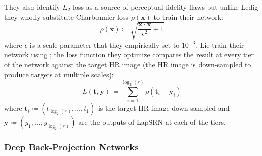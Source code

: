 They also identify \(L_2\) loss as a source of perceptual fidelity flaws but unlike Ledig \etal they wholly substitute Charbonnier loss \cite{charbonnier1994two} \(\rho(\bm{x})\) to train their network:
\begin{equation}
    \rho(\bm{x}) \coloneqq \sqrt{\frac{\bm{x}\cdot \bm{x}}{\epsilon^2}+ 1}
\end{equation}
where \(\epsilon\) is a scale parameter that they empirically set to \(10^{-3}\). 
%
Lie \etal train their network using ; the loss function they optimize compares the result at every tier of the network against the target HR image (the HR image is down-sampled to produce targets at multiple scales):
\begin{equation}
    L(\bm{t}, \bm{y}) \coloneqq \sum_{i=1}^{\log_2(r)} \rho(\bm{t}_i - \bm{y}_i)
\end{equation}
where \(\bm{t}_i \coloneqq (t_{\log_2{(r)}}, \dots, t_1)\) is the target HR image down-sampled and \(\bm{y} \coloneqq (y_1, \dots, y_{\log_2(r)})\) are the outputs of LapSRN at each of the tiers.




\subsubsection{Deep Back-Projection Networks}\label{subsubsec:dbpn}




